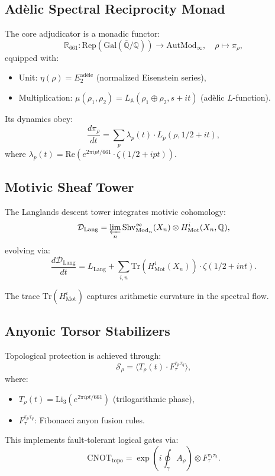 \documentclass[12pt]{article}
\begin{document}
\subsection{Adèlic Spectral Reciprocity Monad}
\label{subsec:reciprocity-monad}
The core adjudicator is a monadic functor:
\[
\mathbb{R}_{661} : \text{Rep}(\text{Gal}(\overline{\mathbb{Q}}/\mathbb{Q})) \to \text{AutMod}_{\infty}, \quad \rho \mapsto \pi_{\rho},
\]
equipped with:
\begin{itemize}
    \item Unit: $\eta(\rho) = E_2^{\text{adèle}}$ (normalized Eisenstein series),
    \item Multiplication: $\mu(\rho_1, \rho_2) = L_{\mathbb{A}}(\rho_1 \oplus \rho_2, s + i t)$ (adèlic $L$-function).
\end{itemize}
Its dynamics obey:
\[
\frac{d\pi_{\rho}}{dt} = \sum_p \lambda_p(t) \cdot L_p(\rho, 1/2 + i t),
\]
where $\lambda_p(t) = \text{Re}(e^{2\pi i p t / 661} \cdot \zeta(1/2 + i p t))$.

\subsection{Motivic Sheaf Tower}
\label{subsec:motivic-tower}
The Langlands descent tower integrates motivic cohomology:
\[
\mathcal{D}_{\text{Lang}} = \varprojlim_{n} \text{Shv}_{\text{Mod}_n}^{\infty}(X_n) \otimes H^i_{\text{Mot}}(X_n, \mathbb{Q}),
\]
evolving via:
\[
\frac{d\mathcal{D}_{\text{Lang}}}{dt} = L_{\text{Lang}} + \sum_{i,n} \text{Tr}(H^i_{\text{Mot}}(X_n)) \cdot \zeta(1/2 + i n t).
\]
\begin{remark}
The trace $\text{Tr}(H^i_{\text{Mot}})$ captures arithmetic curvature in the spectral flow.
\end{remark}

\subsection{Anyonic Torsor Stabilizers}
\label{subsec:anyonic-torsors}
Topological protection is achieved through:
\[
\mathcal{S}_{\rho} = \langle T_{\rho}(t) \cdot F^{\tau_p \tau_q}_\tau \rangle,
\]
where:
\begin{itemize}
    \item $T_{\rho}(t) = \text{Li}_3(e^{2\pi i p t / 661})$ (trilogarithmic phase),
    \item $F^{\tau_p \tau_q}_\tau$: Fibonacci anyon fusion rules.
\end{itemize}
This implements fault-tolerant logical gates via:
\[
\text{CNOT}_{\text{topo}} = \exp\left(i \oint_{\gamma} A_\rho \right) \otimes F^{\tau_1 \tau_2}_\tau.
\]
\end{document}
